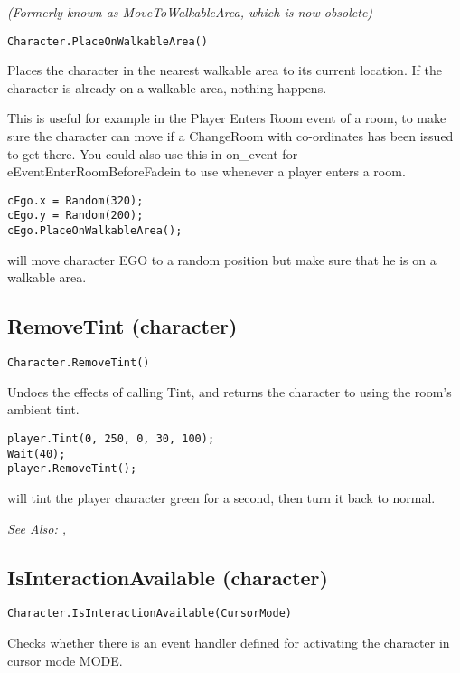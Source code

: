 \it{(Formerly known as MoveToWalkableArea, which is now obsolete)}

\begin{verbatim}
Character.PlaceOnWalkableArea()
\end{verbatim}
Places the character in the nearest walkable area to its current location.
If the character is already on a walkable area, nothing happens.

This is useful for example in the Player Enters Room event of a room, to
make sure the character can move if a ChangeRoom with co-ordinates has been issued to get there.
You could also use this in on_event for eEventEnterRoomBeforeFadein to use whenever a
player enters a room.

\begin{verbatim}
cEgo.x = Random(320);
cEgo.y = Random(200);
cEgo.PlaceOnWalkableArea();
\end{verbatim}
will move character EGO to a random position but make sure that he is on a walkable area.


\subsection{RemoveTint (character)}\label{Character.RemoveTint}%

\begin{verbatim}
Character.RemoveTint()
\end{verbatim}

Undoes the effects of calling Tint, and returns the character to using the room's ambient tint.

\begin{verbatim}
player.Tint(0, 250, 0, 30, 100);
Wait(40);
player.RemoveTint();
\end{verbatim}
will tint the player character green for a second, then turn it back to normal.

\it{See Also:} ,


\subsection{IsInteractionAvailable (character)}\label{Character.IsInteractionAvailable}%

\begin{verbatim}
Character.IsInteractionAvailable(CursorMode)
\end{verbatim}
Checks whether there is an event handler defined for activating the character
in cursor mode MODE.

